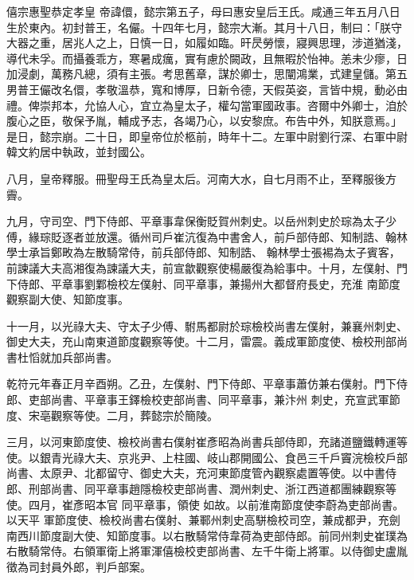 
\begin{pinyinscope}

 僖宗惠聖恭定孝皇
 帝諱儇，懿宗第五子，母曰惠安皇后王氏。咸通三年五月八日生於東內。初封普王，名儼。十四年七月，懿宗大漸。其月十八日，制曰：「朕守大器之重，居兆人之上，日慎一日，如履如臨。旰昃勞懷，寢興思理，涉道猶淺，導代未孚。而攝養乖方，寒暑成癘，實有慮於闕政，且無暇於怡神。恙未少瘳，日加浸劇，萬務凡總，須有主張。考思舊章，謀於卿士，思闡鴻業，式建皇儲。第五男普王儼改名儇，孝敬溫恭，寬和博厚，日新令德，天假英姿，言皆中規，動必由禮。俾崇邦本，允協人心，宜立為皇太子，權勾當軍國政事。咨爾中外卿士，洎於腹心之臣，敬保予胤，輔成予志，各竭乃心，以安黎庶。布告中外，知朕意焉。」是日，懿宗崩。二十日，即皇帝位於柩前，時年十二。左軍中尉劉行深、右軍中尉韓文約居中執政，並封國公。



 八月，皇帝釋服。冊聖母王氏為皇太后。河南大水，自七月雨不止，至釋服後方霽。



 九月，守司空、門下侍郎、平章事韋保衡貶賀州刺史。以岳州刺史於琮為太子少傅，緣琮貶逐者並放還。循州司戶崔沆復為中書舍人，前戶部侍郎、知制誥、翰林學士承旨鄭畋為左散騎常侍，前兵部侍郎、知制誥、
 翰林學士張裼為太子賓客，前諫議大夫高湘復為諫議大夫，前宣歙觀察使楊嚴復為給事中。十月，左僕射、門下侍郎、平章事劉鄴檢校左僕射、同平章事，兼揚州大都督府長史，充淮
 南節度觀察副大使、知節度事。



 十一月，以光祿大夫、守太子少傅、駙馬都尉於琮檢校尚書左僕射，兼襄州刺史、御史大夫，充山南東道節度觀察等使。十二月，雷震。義成軍節度使、檢校刑部尚書杜慆就加兵部尚書。



 乾符元年春正月辛酉朔。乙丑，左僕射、門下侍郎、平章事蕭仿兼右僕射。門下侍郎、吏部尚書、平章事王鐸檢校吏部尚書、同平章事，兼汴州
 刺史，充宣武軍節度、宋亳觀察等使。二月，葬懿宗於簡陵。



 三月，以河東節度使、檢校尚書右僕射崔彥昭為尚書兵部侍即，充諸道鹽鐵轉運等使。以銀青光祿大夫、京兆尹、上柱國、岐山郡開國公、食邑三千戶竇浣檢校戶部尚書、太原尹、北都留守、御史大夫，充河東節度管內觀察處置等使。以中書侍郎、刑部尚書、同平章事趙隱檢校吏部尚書、潤州刺史、浙江西道都團練觀察等使。四月，崔彥昭本官
 同平章事，領使
 如故。以前淮南節度使李蔚為吏部尚書。以天平
 軍節度使、檢校尚書右僕射、兼鄆州刺史高駢檢校司空，兼成都尹，充劍南西川節度副大使、知節度事。以右散騎常侍韋荷為吏部侍郎。前同州刺史崔璞為右散騎常侍。右領軍衛上將軍渾僖檢校吏部尚書、左千牛衛上將軍。以侍御史盧胤徵為司封員外郎，判戶部案。




\end{pinyinscope}
